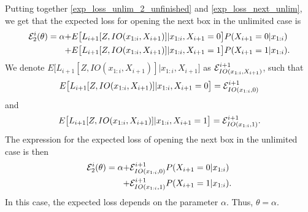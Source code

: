 

Putting together \eqref{exp_loss_unlim_2_unfinished} and \eqref{exp_loss_next_unlim}, we get that the expected loss for opening the next box in the unlimited case is
\begin{equation}
    \begin{aligned}
        \mathcal{E}^i_{2}(\theta) = \alpha 
        + &E \big[L_{i+1}[Z,IO(x_{1:i},X_{i+1})] |x_{1:i},X_{i+1}=0\big]P(X_{i+1}=0|x_{1:i}) \\
        +& E \big[L_{i+1}[Z,IO(x_{1:i},X_{i+1})] |x_{1:i},X_{i+1}=1\big]P(X_{i+1}=1|x_{1:i}).
    \end{aligned}
\end{equation}
We denote $E \big[L_{i+1}[Z,IO(x_{1:i},X_{i+1})] |x_{1:i},X_{i+1}\big]$ as $\mathcal{E}^{i+1}_{IO(x_{1:i},X_{i+1})}$, such that
\begin{equation*}
    E \big[L_{i+1}[Z,IO(x_{1:i},X_{i+1})] |x_{1:i},X_{i+1}=0\big] = \mathcal{E}^{i+1}_{IO(x_{1:i},0)}
\end{equation*}
and
\begin{equation*}
    E \big[L_{i+1}[Z,IO(x_{1:i},X_{i+1})] |x_{1:i},X_{i+1}=1\big] = \mathcal{E}^{i+1}_{IO(x_{1:i},1)}.
\end{equation*}
The expression for the expected loss of opening the next box in the unlimited case is then
\begin{equation}
\label{exp_loss_next_box_unlim}
    \begin{aligned}
        \mathcal{E}^i_{2}(\theta) 
        = \alpha + &\mathcal{E}^{i+1}_{IO(x_{1:i},0)} P(X_{i+1}=0|x_{1:i})\\
        + &\mathcal{E}^{i+1}_{IO(x_{1:i},1)} P(X_{i+1}=1|x_{1:i}).
    \end{aligned}
\end{equation}
In this case, the expected loss depends on the parameter $\alpha$. Thus, $\theta = \alpha$. 

